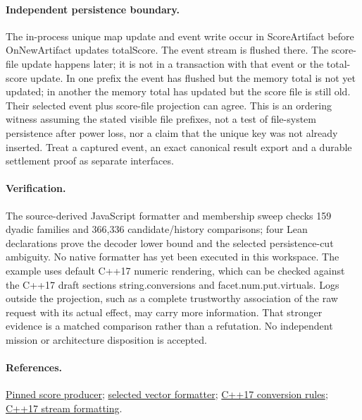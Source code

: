\documentclass[11pt]{article}
\begin{document}
\paragraph{Independent persistence boundary.} The in-process unique
map update and event write occur in ScoreArtifact before
OnNewArtifact updates totalScore. The event stream is flushed there.
The score-file update happens later; it is not in a transaction
with that event or the total-score update. In one prefix the event
has flushed but the memory total is not yet updated; in another
the memory total has updated but the score file is still old.
Their selected event plus score-file projection can agree.
This is an ordering witness assuming the stated visible file
prefixes, not a test of file-system persistence after power loss,
nor a claim that the unique key was not already inserted. Treat
a captured event, an exact canonical result export and a durable
settlement proof as separate interfaces.

\paragraph{Verification.} The source-derived JavaScript formatter
and membership sweep checks 159 dyadic families and 366,336
candidate/history comparisons; four Lean declarations prove the
decoder lower bound and the selected persistence-cut ambiguity.
No native formatter has yet been executed in this workspace. The
example uses default C++17 numeric rendering, which can be checked
against the C++17 draft sections string.conversions and
facet.num.put.virtuals. Logs outside the projection, such as a
complete trustworthy association of the raw request with its
actual effect, may carry more information. That stronger evidence
is a matched comparison rather than a refutation. No independent
mission or architecture disposition is accepted.

\paragraph{References.} \href{https://github.com/osrf/subt/blob/083c6a8acb0c25aa1a35e34517e628cd3b52ae77/subt_ign/src/GameLogicPlugin.cc}{Pinned score producer};
\href{https://github.com/gazebosim/gz-math/blob/4ca6553b3ee6cae6696e8abe3aa70ca163274de4/include/gz/math/Vector3.hh}{selected vector formatter};
\href{https://timsong-cpp.github.io/cppwp/n4659/string.conversions}{C++17 conversion rules};
\href{https://timsong-cpp.github.io/cppwp/n4659/facet.num.put.virtuals}{C++17 stream formatting}.
\end{document}
